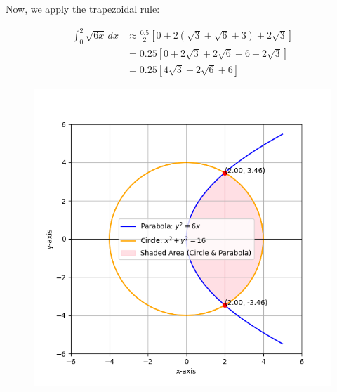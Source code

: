 \documentclass[journal]{IEEEtran}
\begin{document}
Now, we apply the trapezoidal rule:

\begin{align*}
\int_0^2 \sqrt{6x} \, dx &\approx \frac{0.5}{2} \left[ 0 + 2 \left( \sqrt{3} + \sqrt{6} + 3 \right) + 2\sqrt{3} \right] \\
&= 0.25 \left[ 0 + 2\sqrt{3} + 2\sqrt{6} + 6 + 2\sqrt{3} \right] \\
&= 0.25 \left[ 4\sqrt{3} + 2\sqrt{6} + 6 \right]
\end{align*}
\begin{figure}[h]
    \centering
    \includegraphics[width=\textwidth]{figs/fig.png}
\end{figure}
\end{document}

